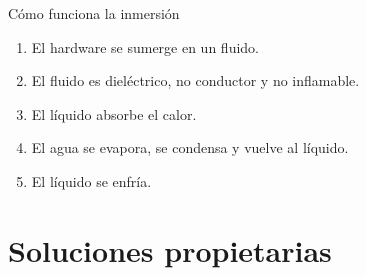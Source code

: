 \documentclass[aspectratio=169, compress]{beamer}
\begin{document}
\begin{frame}{Cómo funciona la inmersión}
    \begin{enumerate}
        \item El hardware se sumerge en un fluido.
        \item El fluido es dieléctrico, no conductor y no inflamable.
        \item El líquido absorbe el calor.
        \item El agua se evapora, se condensa y vuelve al líquido.
        \item El líquido se enfría.
    \end{enumerate}
\end{frame}

\section{Soluciones propietarias}
\end{document}
